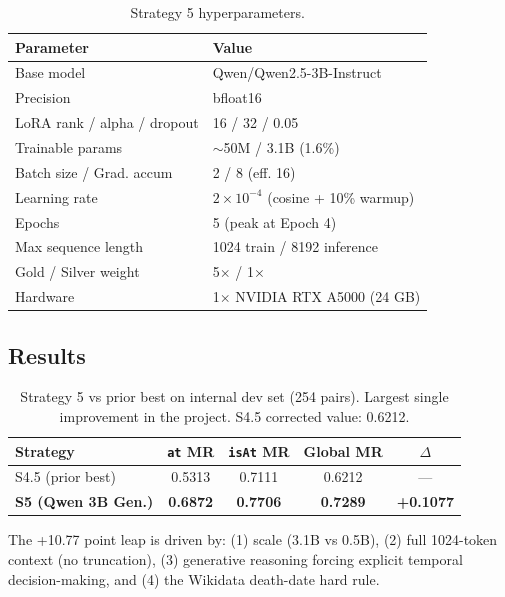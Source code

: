 \documentclass{ceurart}
\begin{document}
\begin{table}[ht]
  \caption{Strategy 5 hyperparameters.}
  \label{tab:s5-hp}
  \centering
  \begin{tabular}{ll}
    \toprule
    \textbf{Parameter} & \textbf{Value} \\
    \midrule
    Base model & Qwen/Qwen2.5-3B-Instruct \\
    Precision & bfloat16 \\
    LoRA rank / alpha / dropout & 16 / 32 / 0.05 \\
    Trainable params & $\sim$50M / 3.1B (1.6\%) \\
    Batch size / Grad. accum & 2 / 8 (eff. 16) \\
    Learning rate & $2\times10^{-4}$ (cosine + 10\% warmup) \\
    Epochs & 5 (peak at Epoch 4) \\
    Max sequence length & 1024 train / 8192 inference \\
    Gold / Silver weight & 5$\times$ / 1$\times$ \\
    Hardware & 1$\times$ NVIDIA RTX A5000 (24 GB) \\
    \bottomrule
  \end{tabular}
\end{table}

\subsection{Results}

\begin{table}[ht]
  \caption{Strategy 5 vs prior best on internal dev set (254 pairs). Largest single improvement in the project. S4.5 corrected value: 0.6212.}
  \label{tab:s5}
  \centering
  \begin{tabular}{lcccc}
    \toprule
    \textbf{Strategy} & \textbf{\texttt{at} MR} & \textbf{\texttt{isAt} MR} & \textbf{Global MR} & \textbf{$\Delta$} \\
    \midrule
    S4.5 (prior best) & 0.5313 & 0.7111 & 0.6212 & --- \\
    \textbf{S5 (Qwen 3B Gen.)} & \textbf{0.6872} & \textbf{0.7706} & \textbf{0.7289} & \textbf{+0.1077} \\
    \bottomrule
  \end{tabular}
\end{table}

The +10.77 point leap is driven by: (1) scale (3.1B vs 0.5B), (2) full 1024-token context (no truncation), (3) generative reasoning forcing explicit temporal decision-making, and (4) the Wikidata death-date hard rule.
\end{document}
